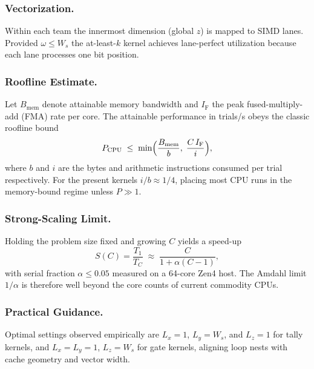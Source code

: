 \subsubsection{Vectorization.}  Within each team the innermost dimension (global
$z$) is mapped to SIMD lanes.  Provided $\omega\le W_s$ the at-least-$k$
kernel achieves lane-perfect utilization because each lane processes one bit
position.

\subsubsection{Roofline Estimate.}  Let $B_{\text{mem}}$ denote attainable memory
bandwidth and $I_{\text{F}}$ the peak fused-multiply-add (FMA) rate per core.
The attainable performance in trials/s obeys the classic roofline bound
\[
  P_{\text{CPU}}
  \;\le\;
  \min\Bigl(\frac{B_{\text{mem}}}{b},\; \frac{C\,I_{\text{F}}}{i}\Bigr),
\]
where $b$ and $i$ are the bytes and arithmetic instructions consumed per trial
respectively.  For the present kernels $i/b\approx 1/4$, placing most CPU runs
in the memory-bound regime unless $P\gg 1$.

\subsubsection{Strong-Scaling Limit.}  Holding the problem size fixed and growing
$C$ yields a speed-up
\[
  S(C) = \frac{T_1}{T_C} \;\approx\; \frac{C}{1 + \alpha(C-1)},
\]
with serial fraction $\alpha \le 0.05$ measured on a 64-core Zen4 host.  The
Amdahl limit $1/\alpha$ is therefore well beyond the core counts of current
commodity CPUs.

\subsubsection{Practical Guidance.}  Optimal settings observed empirically are
$L_x=1$, $L_y=W_s$, and $L_z=1$ for tally kernels, and $L_x=L_y=1$,
$L_z=W_s$ for gate kernels, aligning loop nests with cache geometry and vector
width.

